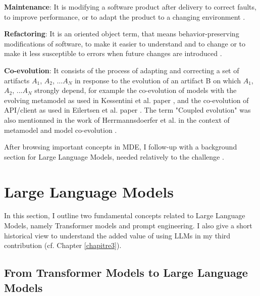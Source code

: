 \textbf{Maintenance}: It is modifying a software product after delivery to correct faults, to improve performance, or to adapt the product to a changing environment \cite{schneidewind1987state}.

\textbf{Refactoring}: It is an oriented object term, that means behavior-preserving modifications of software, to make it easier to understand and to change or to make it less susceptible to errors when future changes are introduced \cite{mens2004survey}. 

\textbf{Co-evolution}: It consists of the process of adapting and correcting a set of artifacts $A_1$, $A_2$, ...$A_N$ in response to the evolution of an artifact B on which $A_1$, $A_2$, ...$A_N$  strongly depend, for example the co-evolution of models with the evolving metamodel as used in Kessentini et al. paper \cite{Kessentini2016automated}, and the co-evolution of API/client as used in Eilertsen et al. paper \cite{8443581}. The term "Coupled evolution" was also mentionned in the work of Herrmannsdoerfer et al. in the context of metamodel and model co-evolution \cite{herrmannsdoerfer2009cope}.

After browsing important concepts in MDE, I follow-up with a background section for Large Language Models, needed relatively to the challenge .



\section{Large Language Models}
\label{llm}
In this section, I outline two fundamental concepts related to Large Language Models, namely Transformer models and prompt engineering. I also give a short historical view to understand the added value of using LLMs in my third contribution (cf. Chapter \ref{chapitre3}).


\subsection{From Transformer Models to Large Language Models}

